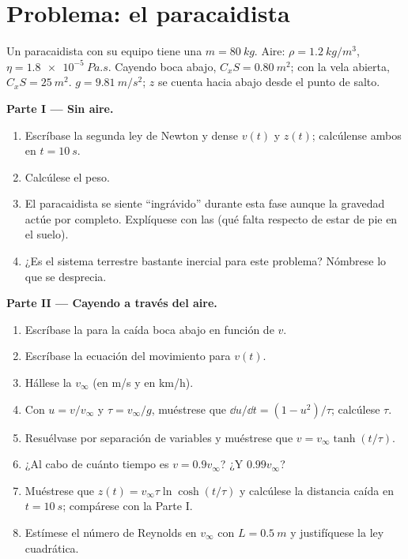 \section{Problema: el paracaidista}

\begin{problem}
\label{pb:b1:newton-dynamics:1}
Un paracaidista con su equipo tiene una  $m = \qty{80}{kg}$. Aire:
$\rho = \qty{1.2}{kg/m^3}$, $\eta = \qty{1.8e-5}{Pa.s}$. Cayendo boca
abajo, $C_xS = \qty{0.80}{m^2}$; con la vela abierta, $C_xS =
\qty{25}{m^2}$. $g = \qty{9.81}{m/s^2}$; $z$ se cuenta hacia abajo desde
el punto de salto.

\medskip
\noindent\textbf{Parte I --- Sin aire.}
\begin{enumerate}
  \item Escríbase la segunda ley de Newton y dense $v(t)$ y $z(t)$;
        calcúlense ambos en $t = \qty{10}{s}$.
  \item Calcúlese el peso.
  \item El paracaidista se siente ``ingrávido'' durante esta fase aunque
        la gravedad actúe por completo. Explíquese con las  (qué
        falta respecto de estar de pie en el suelo).
  \item ¿Es el sistema terrestre bastante inercial para este problema?
        Nómbrese lo que se desprecia.
\end{enumerate}

\medskip
\noindent\textbf{Parte II --- Cayendo a través del aire.}
\begin{enumerate}[resume]
  \item Escríbase la  para la caída boca abajo en
        función de $v$.
  \item Escríbase la ecuación del movimiento para $v(t)$.
  \item Hállese la  $v_\infty$ (en \unit{m/s} y en
        \unit{km/h}).
  \item Con $u = v/v_\infty$ y $\tau = v_\infty/g$, muéstrese que
        $\dd u/\dd t = (1 - u^2)/\tau$; calcúlese $\tau$.
  \item Resuélvase por separación de variables y muéstrese que
        $v = v_\infty\tanh(t/\tau)$.
  \item ¿Al cabo de cuánto tiempo es $v = 0.9v_\infty$? ¿Y $0.99v_\infty$?
  \item Muéstrese que $z(t) = v_\infty\tau\ln\cosh(t/\tau)$ y calcúlese la
        distancia caída en $t = \qty{10}{s}$; compárese con la Parte I.
  \item Estímese el número de Reynolds en $v_\infty$ con $L = \qty{0.5}{m}$
        y justifíquese la ley cuadrática.
\end{enumerate}


\end{problem}
